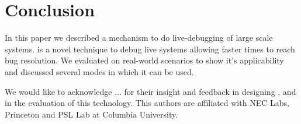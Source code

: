 \section{Conclusion}
\label{sec:conclusion}

In this paper we described \parikshan a mechanism to do live-debugging of large scale systems.
\parikshan is a novel technique to debug live systems allowing faster times to reach bug resolution.
We evaluated \parikshan on real-world scenarios to show it's applicability and discussed several modes in which it can be used.

We would like to acknowledge ... for their insight and feedback in designing \parikshan, and in the evaluation of this technology.
This authors are affiliated with NEC Labs, Princeton and PSL Lab at Columbia University. 
